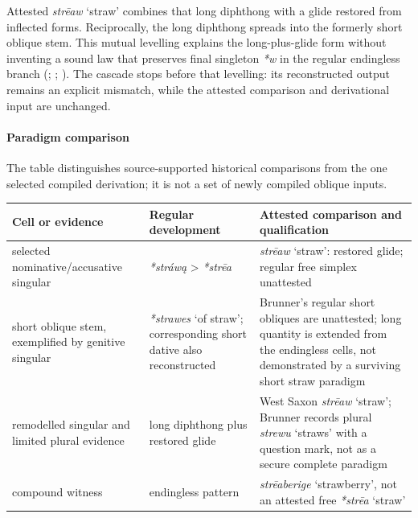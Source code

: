 \documentclass[
  british,
  a4paper,
]{article}
\newcounter{none} %
\providecommand{\Recon}[1]{\emph{*#1}}
\begin{document}
Attested {\emph{strēaw}} `straw' combines that long diphthong with a
glide restored from inflected forms. Reciprocally, the long diphthong
spreads into the formerly short oblique stem. This mutual levelling
explains the long-plus-glide form without inventing a sound law that
preserves final singleton \Recon{w} in the regular endingless branch
(;
;
). The cascade
stops before that levelling: its reconstructed output remains an
explicit mismatch, while the attested comparison and derivational input
are unchanged.

\paragraph{Paradigm comparison}\label{paradigm-comparison-23}

The table distinguishes source-supported historical comparisons from the
one selected compiled derivation; it is not a set of newly compiled
oblique inputs.

{\def\LTcaptype{none} %
\begin{longtable}[]{@{}
  >{\raggedright\arraybackslash}p{}
  >{\raggedright\arraybackslash}p{}
  >{\raggedright\arraybackslash}p{}@{}}
\toprule\noalign{}
\begin{minipage}[b]{\linewidth}\raggedright
Cell or evidence
\end{minipage} & \begin{minipage}[b]{\linewidth}\raggedright
Regular development
\end{minipage} & \begin{minipage}[b]{\linewidth}\raggedright
Attested comparison and qualification
\end{minipage} \\
\midrule\noalign{}
\endhead
\bottomrule\noalign{}
\endlastfoot
selected nominative/accusative singular & \Recon{stráwą} \textgreater{}
\Recon{strēa} & {\emph{strēaw}} `straw': restored glide; regular free
simplex unattested \\
short oblique stem, exemplified by genitive singular & \Recon{strawes}
`of straw'; corresponding short dative also reconstructed & Brunner's
regular short obliques are unattested; long quantity is extended from
the endingless cells, not demonstrated by a surviving short straw
paradigm \\
remodelled singular and limited plural evidence & long diphthong plus
restored glide & West Saxon {\emph{strēaw}} `straw'; Brunner records
plural {\emph{strewu}} `straws' with a question mark, not as a secure
complete paradigm \\
compound witness & endingless pattern & {\emph{strēaberige}}
`strawberry', not an attested free \Recon{strēa} `straw' \\
\end{longtable}
}
\end{document}
